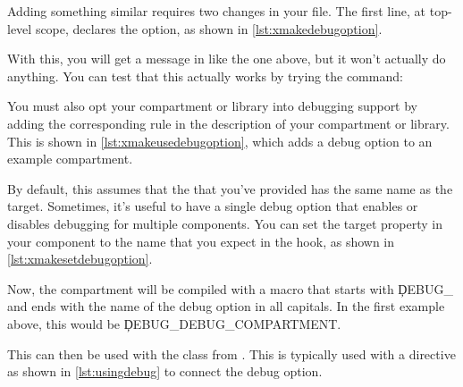 Adding something similar requires two changes in your  file.
The first line, at top-level scope, declares the option, as shown in \ref{lst:xmakedebugoption}.

\lualisting[filename=examples/debug_helpers/xmake.lua,marker=debug_option,label=lst:xmakedebugoption,caption="Build system code for defining a debug option."]{}

With this, you will get a message in    like the one above, but it won't actually do anything.
You can test that this actually works by trying the command:


You must also opt your compartment or library into debugging support by adding the corresponding rule in the description of your compartment or library.
This is shown in \ref{lst:xmakeusedebugoption}, which adds a debug option to an example compartment.

\lualisting[filename=examples/debug_helpers/xmake.lua,marker=use_debug,label=lst:xmakeusedebugoption,caption="Build system code for using a debug option."]{}

By default, this assumes that the  that you've provided has the same name as the target.
Sometimes, it's useful to have a single debug option that enables or disables debugging for multiple components.
You can set the  target property in your component to the name that you expect in the  hook, as shown in \ref{lst:xmakesetdebugoption}.

\lualisting[filename=examples/debug_helpers/xmake.lua,marker=set_debug_option,label=lst:xmakesetdebugoption,caption="Build system code for providing the debug option name explicitly."]{}

Now, the compartment will be compiled with a macro that starts with \c{DEBUG_} and ends with the name of the debug option in all capitals.
In the first example above, this would be \c{DEBUG_DEBUG_COMPARTMENT}.

This can then be used with the  class from .
This is typically used with a  directive as shown in \ref{lst:usingdebug} to connect the debug option.

